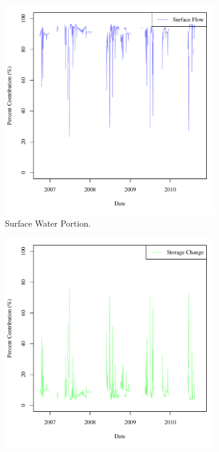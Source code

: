 \begin{linenumbers}
\begin{figure}[htbp]
	\centering
	\begin{subfigure}{0.5\textwidth}
		\centering
		\includegraphics[width=\tableCustomSize]{"Figures/Results_DSR/Stochastic/M Mass Contrib 1"}
		\caption{Surface Water Portion.}
	\end{subfigure}%
	\begin{subfigure}{0.5\textwidth}
		\centering
		\includegraphics[width=\tableCustomSize]{"Figures/Results_DSR/Stochastic/M Mass Contrib 2"}

\end{subfigure}
\end{figure}
\end{linenumbers}
